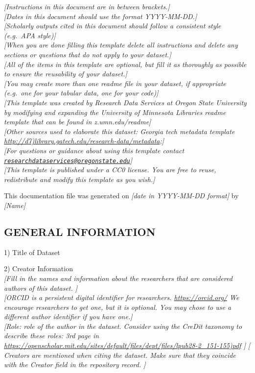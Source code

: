 \documentclass[]{article}
\date{}
\begin{document}
\emph{{[}Instructions in this document are in between brackets.{]}}\\
\emph{{[}Dates in this document should use the format YYYY-MM-DD.{]}}\\
\emph{{[}Scholarly outputs cited in this document should follow a
consistent style (e.g.~APA style){]}}\\
\emph{{[}When you are done filling this template delete all instructions
and delete any sections or questions that do not apply to your
dataset.{]}}\\
\emph{{[}All of the items in this template are optional, but fill it as
thoroughly as possible to ensure the reusability of your dataset.{]}}\\
\emph{{[}You may create more than one readme file in your dataset, if
appropriate (e.g.~one for your tabular data, one for your code){]}}\\
\emph{{[}This template was created by Research Data Services at Oregon
State University by modifying and expanding the University of Minnesota
Libraries readme template that can be found in z.umn.edu/readme{]}}\\
\emph{{[}Other sources used to elaborate this dataset: Georgia tech
metadata template
\url{http://d7)library.gatech.edu/research-data/metadata};{]}}\\
\emph{{[}For questions or guidance about using this template contact
\href{mailto:researchdataservices@oregonstate.edu}{\nolinkurl{researchdataservices@oregonstate.edu}}{]}}\\
\emph{{[}This template is published under a CC0 license. You are free to
reuse, redistribute and modify this template as you wish.{]}}

This documentation file was generated on \emph{{[}date in YYYY-MM-DD
format{]}} by \emph{{[}Name{]}}

\subsection{GENERAL INFORMATION}\label{general-information}

1) Title of Dataset

2) Creator Information\\
\emph{{[}Fill in the names and information about the researchers that
are considered authors of this dataset. {]}}\\
\emph{{[}ORCID is a persistent digital identifier for researchers.
\url{https://orcid.org/} We encourage researchers to get one, but it is
optional. You may chose to use a different author identifier if you have
one.{]}}\\
\emph{{[}Role: role of the author in the dataset. Consider using the
CreDit taxonomy to describe these roles: 3rd page in
\url{https://openscholar.mit.edu/sites/default/files/dept/files/lpub28-2_151-155)pdf}
{]}}
\emph{{[} Creators are mentioned when citing the dataset. Make sure that they coincide with the Creator field in the repository record.
{]}}
\end{document}
